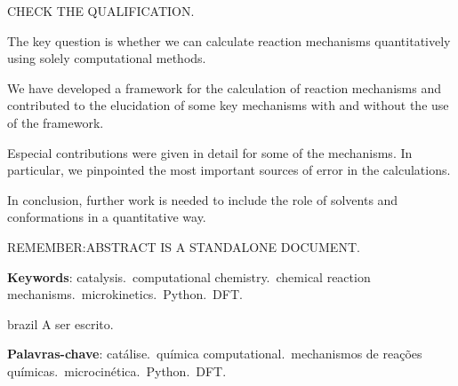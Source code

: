\setlength{\absparsep}{18pt} %

\begin{resumo}[Abstract]
	CHECK THE QUALIFICATION.\@

	The key question is whether we can calculate reaction mechanisms quantitatively
	using solely computational methods.

	We have developed a framework for the calculation of reaction mechanisms and
	contributed to the elucidation of some key mechanisms with and without the use
	of the framework.

	Especial contributions were given in detail for some of the mechanisms.
	In particular, we pinpointed the most important sources of error in the
	calculations.

	In conclusion, further work is needed to include the role of solvents and
	conformations in a quantitative way.

	REMEMBER:\@ ABSTRACT IS A STANDALONE DOCUMENT.\@

	\vspace{\onelineskip}

	\noindent
	\textbf{Keywords}:
	catalysis.\ computational chemistry.\ chemical reaction mechanisms.\ microkinetics.\ Python.\ DFT.\@
\end{resumo}

\begin{resumo}[Resumo]
	\begin{otherlanguage*}{brazil}
		A ser escrito.

		\vspace{\onelineskip}

		\noindent
		\textbf{Palavras-chave}:
		catálise.\ química computational.\ mechanismos de reações químicas.\ microcinética.\ Python.\ DFT.\@
	\end{otherlanguage*}
\end{resumo}
